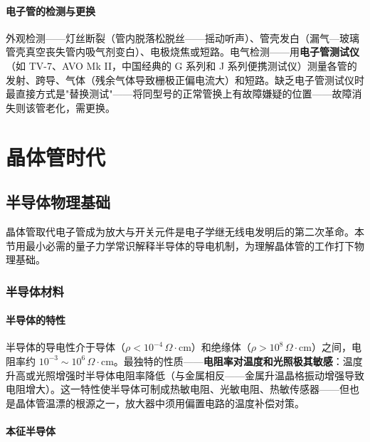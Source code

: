 \documentclass[12pt,UTF8]{ctexbook}
\begin{document}
\subsection{电子管的检测与更换}

外观检测——灯丝断裂（管内脱落松脱丝——摇动听声）、管壳发白（漏气—玻璃管壳真空丧失管内吸气剂变白）、电极烧焦或短路。电气检测——用\textbf{电子管测试仪}（如 TV-7、AVO Mk II，中国经典的 G 系列和 J 系列便携测试仪）测量各管的发射、跨导、气体（残余气体导致栅极正偏电流大）和短路。缺乏电子管测试仪时最直接方式是"替换测试"——将同型号的正常管换上有故障嫌疑的位置——故障消失则该管老化，需更换。


\part{晶体管时代}

\chapter{半导体物理基础}
\label{chap:semiconductor_basics}

晶体管取代电子管成为放大与开关元件是电子学继无线电发明后的第二次革命。本节用最小必需的量子力学常识解释半导体的导电机制，为理解晶体管的工作打下物理基础。

\section{半导体材料}
\label{sec:semiconductor_material}

\subsection{半导体的特性}

半导体的导电性介于导体（$\rho < 10^{-4}\,\Omega\cdot\mathrm{cm}$）和绝缘体（$\rho > 10^8\,\Omega\cdot\mathrm{cm}$）之间，电阻率约 $10^{-3}\sim10^6\,\Omega\cdot\mathrm{cm}$。最独特的性质——\textbf{电阻率对温度和光照极其敏感}：温度升高或光照增强时半导体电阻率降低（与金属相反——金属升温晶格振动增强导致电阻增大）。这一特性使半导体可制成热敏电阻、光敏电阻、热敏传感器——但也是晶体管温漂的根源之一，放大器中须用偏置电路的温度补偿对策。

\subsection{本征半导体}
\end{document}
